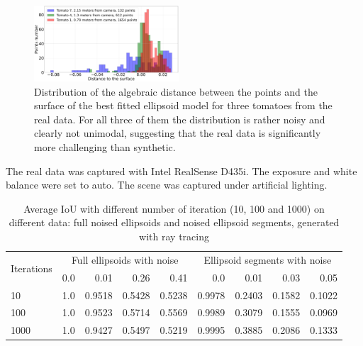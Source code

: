 \begin{figure}[!htb]
  \centering
      \includegraphics[width=0.48\textwidth]{images/wood_rs-55_pcds_distances_over_real_hist_plot_wood2}
      \caption{Distribution of the algebraic distance between the points and the surface of the best fitted ellipsoid model for three tomatoes from the real data. For all three of them the distribution is rather noisy and clearly not unimodal, suggesting that the real data is significantly more challenging than synthetic.}
      \label{fig:wood_rs_55_pcds_distances_over_real_hist_plot_wood}
\end{figure}

The real data was captured with Intel RealSense D435i.
The exposure and white balance were set to auto.
The scene was captured under artificial lighting.

\begin{table}[!htb]
  \centering
  \begin{tabular}{lrrrrrrrr}
  \toprule
  \multirow{2}{*}{Iterations} & \multicolumn{4}{c}{Full ellipsoids with noise} & \multicolumn{4}{c}{Ellipsoid segments with noise} \\
  \cmidrule(lr){2-5} \cmidrule(lr){6-9}
   & 0.0 & 0.01 & 0.26 & 0.41 & 0.0 & 0.01 & 0.03 & 0.05 \\
  \midrule
  10 & 1.0 & 0.9518 & 0.5428 & 0.5238 & 0.9978 & 0.2403 & 0.1582 & 0.1022 \\
  100 & 1.0 & 0.9523 & 0.5714 & 0.5569 & 0.9989 & 0.3079 & 0.1555 & 0.0969 \\
  1000 & 1.0 & 0.9427 & 0.5497 & 0.5219 & 0.9995 & 0.3885 & 0.2086 & 0.1333 \\
  \bottomrule
  \end{tabular}
  \caption{Average IoU with different number of iteration (10, 100 and 1000) on different data: full noised ellipsoids and noised ellipsoid segments, generated with ray tracing}
  \label{tabularx:iou_tables}
  \end{table}

